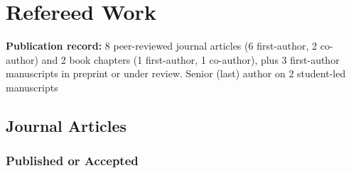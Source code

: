 \section{Refereed Work}
\textbf{Publication record:} 8 peer-reviewed journal articles (6 first-author,
2 co-author) and 2 book chapters (1 first-author, 1 co-author), plus 3
first-author manuscripts in preprint or under review. Senior (last) author on 2
student-led manuscripts

\medskip
\legenddirect
\legendco

\subsection{Journal Articles}
\subsubsection{Published or Accepted}
